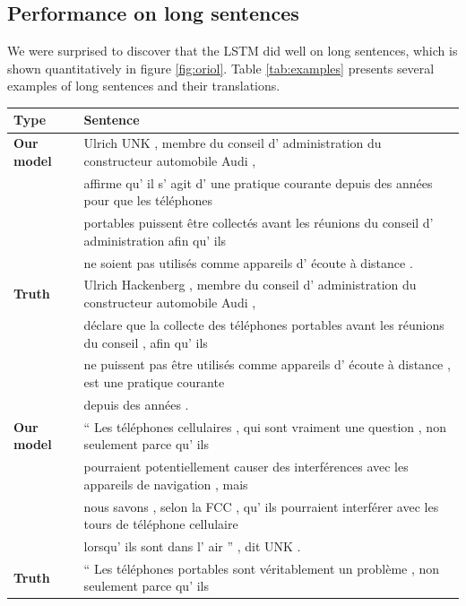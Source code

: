 \documentclass{article}
\begin{document}
\subsection{Performance on long sentences}
\label{sec:long_sentences}

We were surprised to discover that the LSTM did well on long
sentences, which is shown quantitatively in figure \ref{fig:oriol}.
Table \ref{tab:examples} presents several examples of long sentences and
their translations. 

\begin{table}[ht!]
\centering
\begin{footnotesize}
\begin{tabular}{|l|l|}
\hline
{\bf  Type} & {\bf Sentence} \\ 
\hline
\hline
{\bf Our model} & Ulrich UNK , membre du conseil d' administration du constructeur automobile Audi , \\
& affirme qu' il s' agit d' une pratique courante depuis des ann\'{e}es pour que les t\'{e}l\'{e}phones \\
& portables  puissent  \^{e}tre collect\'{e}s avant les r\'{e}unions du conseil d' administration afin qu' ils\\
&  ne soient pas  utilis\'{e}s comme appareils d' \'{e}coute \`{a} distance .\\
\hline
{\bf  Truth} &  Ulrich Hackenberg , membre du conseil d' administration du constructeur automobile Audi ,   \\
& d\'{e}clare que la collecte des t\'{e}l\'{e}phones portables avant les r\'{e}unions du conseil , afin qu' ils  \\
& ne puissent pas \^{e}tre utilis\'{e}s comme appareils d' \'{e}coute \`{a} distance , est une pratique courante \\ 
& depuis des ann\'{e}es .\\
\hline\hline
{\bf Our model} & 
`` Les t\'{e}l\'{e}phones cellulaires , qui sont vraiment une question , non seulement parce qu' ils \\
& pourraient potentiellement causer des interf\'{e}rences avec les appareils de navigation , mais \\
& nous savons , selon la FCC , qu' ils pourraient interf\'{e}rer avec les tours de t\'{e}l\'{e}phone cellulaire \\
& lorsqu' ils sont dans l' air '' , dit UNK .\\
\hline
{\bf Truth} & 
`` Les t\'{e}l\'{e}phones portables sont v\'{e}ritablement un probl\`{e}me , non seulement parce qu' ils \\

\end{tabular}
\end{footnotesize}
\end{table}
\end{document}
